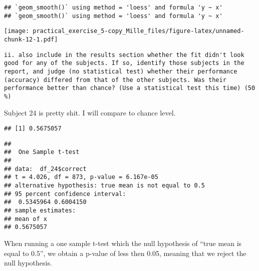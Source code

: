 \documentclass[
]{article}
\newenvironment{Shaded}{\begin{snugshade}}{\end{snugshade}}
\newcommand{\AttributeTok}[1]{\textcolor[rgb]{0.77,0.63,0.00}{#1}}
\newcommand{\CommentTok}[1]{\textcolor[rgb]{0.56,0.35,0.01}{\textit{#1}}}
\newcommand{\FloatTok}[1]{\textcolor[rgb]{0.00,0.00,0.81}{#1}}
\newcommand{\FunctionTok}[1]{\textcolor[rgb]{0.00,0.00,0.00}{#1}}
\newcommand{\NormalTok}[1]{#1}
\newcommand{\OtherTok}[1]{\textcolor[rgb]{0.56,0.35,0.01}{#1}}
\newcommand{\SpecialCharTok}[1]{\textcolor[rgb]{0.00,0.00,0.00}{#1}}
\newcommand{\StringTok}[1]{\textcolor[rgb]{0.31,0.60,0.02}{#1}}
\begin{document}
\begin{verbatim}
## `geom_smooth()` using method = 'loess' and formula 'y ~ x'
## `geom_smooth()` using method = 'loess' and formula 'y ~ x'
\end{verbatim}

\texttt{[image: practical\_exercise\_5-copy\_Mille\_files/figure-latex/unnamed-chunk-12-1.pdf]}

\begin{verbatim}
ii. also include in the results section whether the fit didn't look good for any of the subjects. If so, identify those subjects in the report, and judge (no statistical test) whether their performance (accuracy) differed from that of the other subjects. Was their performance better than chance? (Use a statistical test this time) (50 %)  
\end{verbatim}

Subject 24 is pretty shit. I will compare to chance level.

\begin{Shaded}
\end{Shaded}

\begin{verbatim}
## [1] 0.5675057
\end{verbatim}

\begin{Shaded}
\end{Shaded}

\begin{verbatim}
## 
##  One Sample t-test
## 
## data:  df_24$correct
## t = 4.026, df = 873, p-value = 6.167e-05
## alternative hypothesis: true mean is not equal to 0.5
## 95 percent confidence interval:
##  0.5345964 0.6004150
## sample estimates:
## mean of x 
## 0.5675057
\end{verbatim}

When running a one sample t-test which the null hypothesis of ``true
mean is equal to 0.5'', we obtain a p-value of less then 0.05, meaning
that we reject the null hypothesis.
\end{document}
